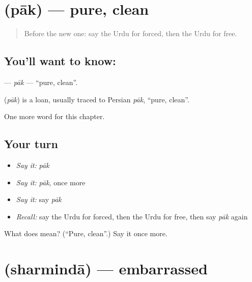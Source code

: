 \section[\texorpdfstring{\ur{پاک} (pāk)}{پاک (pāk)}]{ (pāk) — pure, clean}

\label{lesson:UR-C163-pak}



\begin{quote}
Before the new one: say the Urdu for forced, then the Urdu for free.
\end{quote}

\subsection*{You'll want to know: }
\textbf{} — \emph{pāk} — \textquotedblleft{}pure, clean\textquotedblright{}.

\begin{cousinweb}
\textbf{} (\emph{pāk}) is a loan, usually traced to Persian \emph{pāk}, \textquotedblleft{}pure, clean\textquotedblright{}.
\end{cousinweb}

\begin{grammarlens}[title={What you've built}]
One more word for this chapter.
\end{grammarlens}

\subsection*{Your turn}
\begin{itemize}
\raggedright
  \item \emph{Say it:} \emph{pāk}
  \item \emph{Say it:} \emph{pāk}, once more
  \item \emph{Say it:} say \emph{pāk}
  \item \emph{Recall:} say the Urdu for forced, then the Urdu for free, then say \emph{pāk} again
\end{itemize}

\begin{tcolorbox}[breakable,colback=teal!4,colframe=teal!35!black,title={Before you move on}]
What does  mean? (\textquotedblleft{}Pure, clean\textquotedblright{}.) Say it once more.
\end{tcolorbox}
\section[\texorpdfstring{\ur{شرمندہ} (sharmindā)}{شرمندہ (sharmindā)}]{ (sharmindā) — embarrassed}

